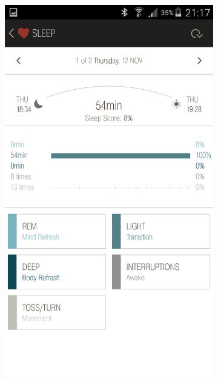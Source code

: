 \documentclass[12pt,a4paper]{article}
\begin{document}
\begin{figure}[H]
    \begin{subfigure}[b]{0.5\textwidth}
        \includegraphics[width=\textwidth]{12-11-15-1.png}
     \end{subfigure}
    ~ %
    \begin{subfigure}[b]{0.5\textwidth}

\end{subfigure}
\end{figure}
\end{document}
